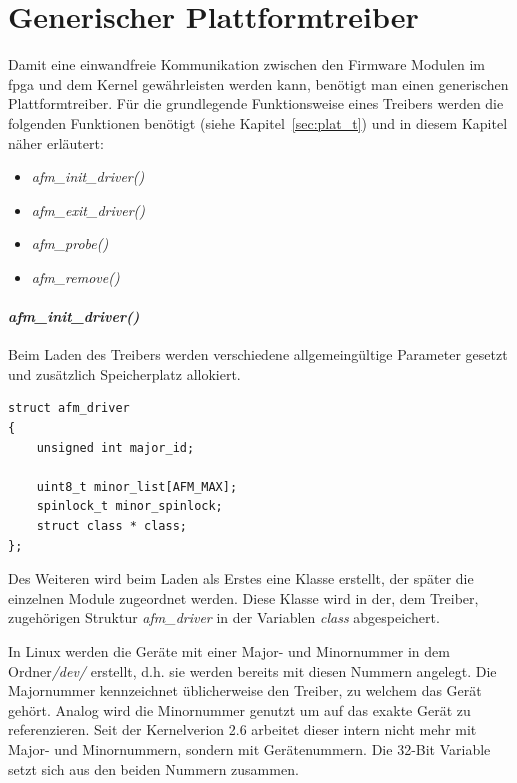 \section{Generischer Plattformtreiber} \label{sec:plat}
Damit eine einwandfreie Kommunikation zwischen den Firmware Modulen im \ac{fpga} und dem Kernel gewährleisten werden kann, benötigt man einen generischen Plattformtreiber.
Für die grundlegende  Funktionsweise eines Treibers werden die folgenden Funktionen benötigt (siehe Kapitel~\ref{sec:plat_t}) und in diesem Kapitel näher erläutert:
\begin{itemize}
	\item \textit{afm\_init\_driver()}
	\item \textit{afm\_exit\_driver()}
	\item \textit{afm\_probe()}
	\item \textit{afm\_remove()}
\end{itemize}


\paragraph*{\textit{afm\_init\_driver()}}
Beim Laden des Treibers werden verschiedene allgemeingültige Parameter gesetzt und zusätzlich Speicherplatz allokiert. 


\begin{lstfloat}
\begin{lstlisting}
struct afm_driver
{
	unsigned int major_id;

	uint8_t minor_list[AFM_MAX];
	spinlock_t minor_spinlock;
	struct class * class;
};
\end{lstlisting}
\end{lstfloat}

Des Weiteren wird beim Laden als Erstes eine Klasse erstellt, der später die einzelnen Module zugeordnet werden. Diese Klasse wird in der, dem Treiber, zugehörigen Struktur \textit{afm\_driver} in der Variablen \textit{class} abgespeichert. 

In Linux werden die Geräte mit einer Major- und Minornummer in dem Ordner\textit{/dev/} erstellt, d.h. sie werden bereits mit diesen Nummern angelegt.
Die Majornummer kennzeichnet üblicherweise den Treiber, zu welchem das Gerät gehört. Analog wird die Minornummer genutzt um auf das exakte Gerät zu referenzieren. \citep[S. 43f.]{corbet2005linux} %
Seit der Kernelverion 2.6 arbeitet dieser intern nicht mehr mit Major- und Minornummern, sondern mit Gerätenummern. Die 32-Bit Variable setzt sich aus den beiden Nummern zusammen. \citep[Seite 244]{schroder2009embedded}%


